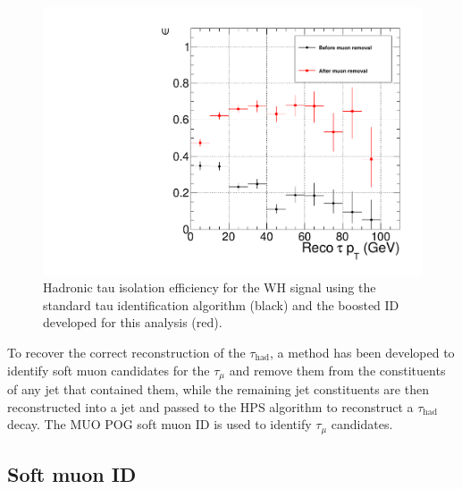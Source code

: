 \begin{figure}[hbtp]
  \begin{center}
    \includegraphics[width=\cmsFigWidth]{figures/effVsPT_MCTruthMuonRemoval_LooseCombinedIsolationDBSumPtCorr_canvas}
    \caption{Hadronic tau isolation efficiency for the WH signal using the standard tau identification algorithm (black) and the boosted ID developed for this analysis (red).}
    \label{fig:evt-sel-HPS-iso-eff-standard-vs-boosted-ID}
  \end{center}
\end{figure}

To recover the correct reconstruction of the $\tau_{\text{had}}$, a method has been developed to identify soft muon candidates for the $\tau_{\mu}$ and remove them from the constituents of any jet that contained them, while the remaining jet constituents are then reconstructed into a jet and passed to the HPS algorithm to reconstruct a $\tau_{\text{had}}$ decay. The MUO POG soft muon ID is used to identify $\tau_{\mu}$ candidates.

\subsection{Soft muon ID\label{sec:evtsel-softmu}}

